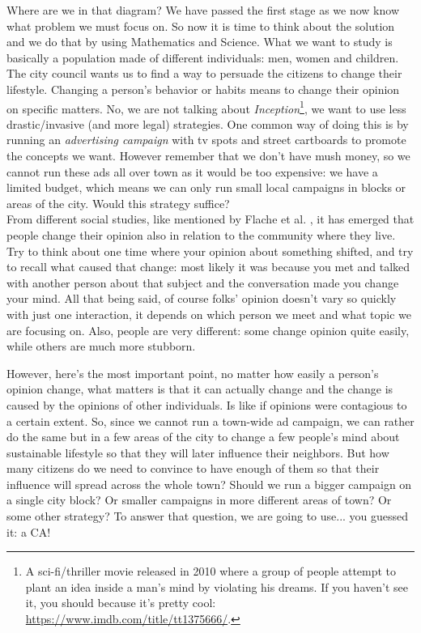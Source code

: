 Where are we in that diagram? We have passed the first stage as we now know what problem we must focus
on. So now it is time to think about the solution and we do that by using Mathematics and Science. What we
want to study is basically a population made of different individuals: men, women and children.
The city council wants us to find a way to persuade the citizens to change their lifestyle. Changing
a person's behavior or habits means to change their opinion on specific matters. No, we are not talking
about \textit{Inception}\footnote{A sci-fi/thriller movie released in 2010 where a group
of people attempt to plant an idea inside a man's mind by violating his dreams. 
If you haven't see
it, you should because it's pretty cool: \url{https://www.imdb.com/title/tt1375666/}.}, we want to
use less drastic/invasive (and more legal) strategies. One common way of doing this is by
running an \textit{advertising campaign} with tv spots and street cartboards to promote
the concepts we want. However remember that we don't have mush money, so we cannot run these ads all
over town as it would be too expensive: we have a limited budget, which means we can only run small
local campaigns in blocks or areas of the city. Would this strategy suffice?\\

From different social studies, like mentioned by Flache et al. \cite{flache-opinion},
it has emerged that people change their opinion also in relation to
the community where they live. Try to think about one time where your opinion about something shifted,
and try to recall what caused that change: most likely it was because you met and talked with another
person about that subject and the conversation made you change your mind. All that being said,
of course folks' opinion doesn't vary so quickly with just one interaction, it depends
on which person we meet and what topic we are focusing on. Also, people are very different: some
change opinion quite easily, while others are much more stubborn.

However, here's the most important point, no matter how easily a person's opinion change, what matters
is that it can actually change and the change is caused by the opinions of other individuals. Is like
if opinions were contagious to a certain extent. So, since we cannot run a town-wide ad campaign, we can
rather do the same but in a few areas of the city to change a few people's mind
about sustainable lifestyle so that they will later influence their neighbors. But how many citizens
do we need to convince to have enough of them so that their influence will spread across the whole town?
Should we run a bigger campaign on a single city block? Or smaller campaigns in more different areas
of town? Or some other strategy?
To answer that question, we are going to use... you guessed it: a CA!\\

